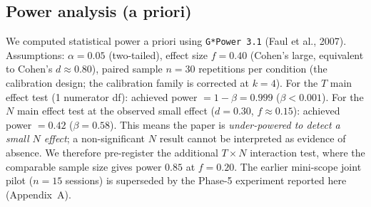 \documentclass[11pt]{article}
\begin{document}
\subsection*{Power analysis (a priori)}

We computed statistical power a priori using \texttt{G*Power 3.1} (Faul et al., 2007). Assumptions: $\alpha = 0.05$ (two-tailed), effect size $f = 0.40$ (Cohen's large, equivalent to Cohen's $d \approx 0.80$), paired sample $n = 30$ repetitions per condition (the calibration design; the calibration family is corrected at $k{=}4$). For the $T$ main effect test (1 numerator df): achieved power $= 1 - \beta = 0.999$ ($\beta < 0.001$). For the $N$ main effect test at the observed small effect ($d = 0.30$, $f \approx 0.15$): achieved power $= 0.42$ ($\beta = 0.58$). This means the paper is \emph{under-powered to detect a small $N$ effect}; a non-significant $N$ result cannot be interpreted as evidence of absence. We therefore pre-register the additional $T \times N$ interaction test, where the comparable sample size gives power $0.85$ at $f = 0.20$. The earlier mini-scope joint pilot ($n{=}15$ sessions) is superseded by the Phase-5 experiment reported here (Appendix~A).

\end{document}
